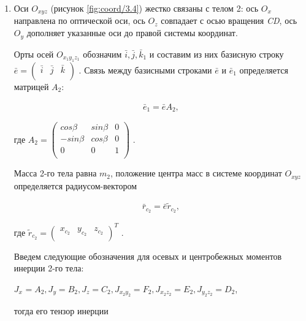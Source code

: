 \begin{enumerate}
	\item Оси \( O_{xyz} \) (рисунок \ref{fig:coord/3.4}) жестко связаны с телом 2: ось \( O_x \) направлена по оптической оси, ось \( O_z \) совпадает с осью вращения \textit{CD}, ось \( O_y \) дополняет указанные оси до правой системы координат. 
	
	Орты осей \( O_{x_{1}y_{1}z_{1}} \) обозначим \( \bar{i},\bar{j},\bar{k}_{1} \) и составим из них базисную строку 
	\( \bar{e}= \left( \begin{matrix}	\bar{i} & \bar{j} & \bar{k}\\	\end{matrix}
	\right) \) . Связь между базисными строками \( \bar{e} \) и \( \bar{e}_{1} \) определяется матрицей \( A_{2} \): 
	
	\begin{equation}
	\label{eq:p3:5}
	\begin{alignedat}{2}
	\bar{e}_{1}=\bar{e}A_{2},
	\end{alignedat}
	\end{equation}
	
	где \( A_{2}= \left( \begin{matrix}
	cos \beta & sin \beta & 0\\
	-sin \beta & cos \beta & 0\\
	0 & 0 & 1\\
	\end{matrix}
	\right) \) . 
	
	Масса 2-го тела равна \( m_{2} \), положение центра масс в системе координат \( O_{xyz} \) определяется радиусом-вектором 
	
	\begin{equation}
	\label{eq:p3:6}
	\begin{alignedat}{2}
	\bar{r}_{c_{2}}=\bar{e} \tilde{r}_{c_{2}},
	\end{alignedat}
	\end{equation}
	
	где \( \tilde{r}_{c_{2}}= \left( \begin{matrix}
	x_{c_{2}} & y_{c_{2}} & z_{c_{2}}\\
	\end{matrix}
	\right) ^{T} \) . 
	
	Введем следующие обозначения для осевых и центробежных моментов инерции 2-го тела: 
	
	\( J_{x_{}}=A_{2},J_{y}=B_{2},J_{z}=C_{2},J_{x_{2}y_{2}}=F_{2},J_{x_{2}z_{2}}=E_{2},J_{y_{2}z_{2}}=D_{2} \), 
	
	тогда его тензор инерции 
	

\end{enumerate}
